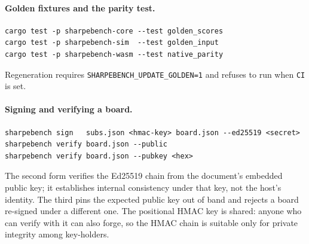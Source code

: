 \paragraph{Golden fixtures and the parity test.}
\begin{verbatim}
cargo test -p sharpebench-core --test golden_scores
cargo test -p sharpebench-sim  --test golden_input
cargo test -p sharpebench-wasm --test native_parity
\end{verbatim}
Regeneration requires \texttt{SHARPEBENCH\_UPDATE\_GOLDEN=1} and refuses to run when \texttt{CI} is set.

\paragraph{Signing and verifying a board.}
\begin{verbatim}
sharpebench sign   subs.json <hmac-key> board.json --ed25519 <secret>
sharpebench verify board.json --public
sharpebench verify board.json --pubkey <hex>
\end{verbatim}
The second form verifies the Ed25519 chain from the document's embedded public key; it establishes internal consistency under that key, not the host's identity. The third pins the expected public key out of band and rejects a board re-signed under a different one. The positional HMAC key is shared: anyone who can verify with it can also forge, so the HMAC chain is suitable only for private integrity among key-holders.
